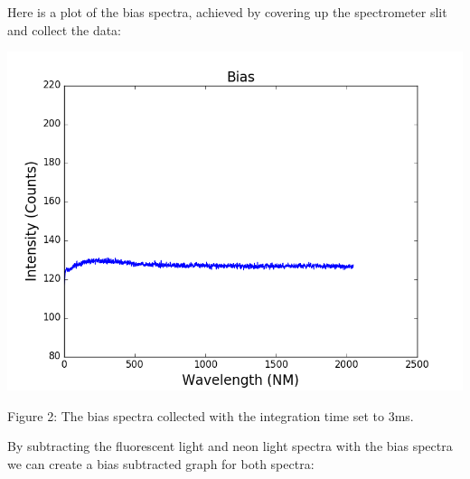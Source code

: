 \documentclass[onecolumn, 12pt, a4paper]{article}
\begin{document}
\newpage

Here is a plot of the bias spectra, achieved by covering up the spectrometer slit and collect the data:

\hspace*{-1cm}\centerline{\includegraphics[scale = .35]{bias.png}}

\centerline{Figure 2: The bias spectra collected with the integration time set to 3ms.} 

\begin{flushleft}
By subtracting the fluorescent light and neon light spectra with the bias spectra we can create a bias subtracted graph for both spectra:
\end{flushleft}
\end{document}
